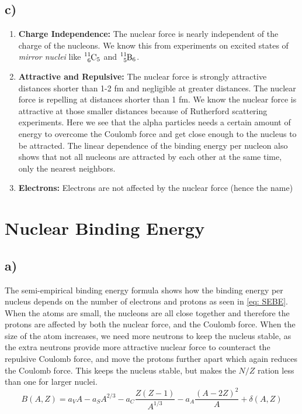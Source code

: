 \documentclass{article}
\begin{document}
\subsection*{c)}
\begin{enumerate}
    \item \textbf{Charge Independence:} The nuclear force is nearly independent of the charge of the nucleons. We know this from experiments on excited states of \textit{mirror nuclei} like $\ce{_{6}^{11}\text{C}_{5}}$ and $\ce{_{5}^{11}\text{B}_{6}}$. 
    \item \textbf{Attractive and Repulsive:} The nuclear force is strongly attractive distances shorter than 1-2 fm and negligible at greater distances. The nuclear force is repelling at distances shorter than 1 fm. We know the nuclear force is attractive at those smaller distances because of Rutherford scattering experiments. Here we see that the alpha particles needs a certain amount of energy to overcome the Coulomb force and get close enough to the nucleus to be attracted. The linear dependence of the binding energy per nucleon also shows that not all nucleons are attracted by each other at the same time, only the nearest neighbors. 
    \item \textbf{Electrons:} Electrons are not affected by the nuclear force (hence the name)
\end{enumerate}


\section{Nuclear Binding Energy}
\subsection*{a)}
The semi-empirical binding energy formula shows how the binding energy per nucleus depends on the number of electrons and protons as seen in \cref{eq: SEBE}.  When the atoms are small, the nucleons are all close together and therefore the protons are affected by both the nuclear force, and the Coulomb force. When the size of the atom increases, we need more neutrons to keep the nucleus stable, as the extra neutrons provide more attractive nuclear force to counteract the repulsive Coulomb force, and move the protons further apart which again reduces the Coulomb force. This keeps the nucleus stable, but makes the $N / Z$ ration less than one for larger nuclei.   
\begin{equation}\label{eq: SEBE}
B(A,Z) = a_{V}A - a_{S}A^{2/3} - a_{C}\frac{Z(Z-1)}{A^{1/3}} - a_{A}\frac{(A-2Z)^{2}}{A} + \delta(A,Z)
\end{equation}
\end{document}
